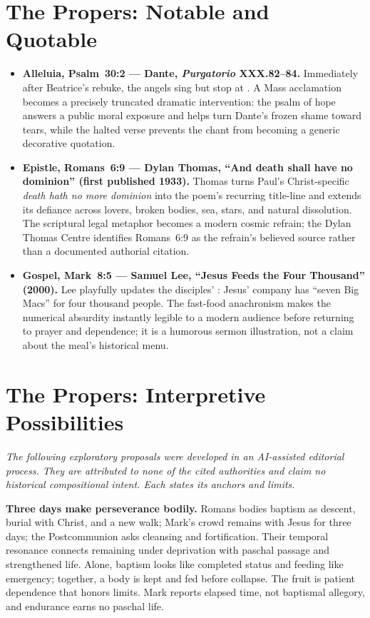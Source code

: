\sectionguard
\section*{The Propers: Notable and Quotable}

{\small
\begin{itemize}[itemsep=0.35em,topsep=0.2em,parsep=0pt]
\item \textbf{Alleluia, Psalm~30:2 --- Dante, \emph{Purgatorio} XXX.82--84.} Immediately after Beatrice's rebuke, the angels sing  but stop at . A Mass acclamation becomes a precisely truncated dramatic intervention: the psalm of hope answers a public moral exposure and helps turn Dante's frozen shame toward tears, while the halted verse prevents the chant from becoming a generic decorative quotation.

\item \textbf{Epistle, Romans~6:9 --- Dylan Thomas, ``And death shall have no dominion'' (first published 1933).} Thomas turns Paul's Christ-specific \emph{death hath no more dominion} into the poem's recurring title-line and extends its defiance across lovers, broken bodies, sea, stars, and natural dissolution. The scriptural legal metaphor becomes a modern cosmic refrain; the Dylan Thomas Centre identifies Romans~6:9 as the refrain's believed source rather than a documented authorial citation.

\item \textbf{Gospel, Mark~8:5 --- Samuel Lee, ``Jesus Feeds the Four Thousand'' (2000).} Lee playfully updates the disciples' : Jesus' company has ``seven Big Macs'' for four thousand people. The fast-food anachronism makes the numerical absurdity instantly legible to a modern audience before returning to prayer and dependence; it is a humorous sermon illustration, not a claim about the meal's historical menu.
\end{itemize}
}

\sectionguard
\section*{The Propers: Interpretive Possibilities}

\noindent\emph{The following exploratory proposals were developed in an AI-assisted editorial process. They are attributed to none of the cited authorities and claim no historical compositional intent. Each states its anchors and limits.}

\noindent\textbf{Three days make perseverance bodily.\enspace{}}
Romans bodies baptism as descent, burial with Christ, and a new walk; Mark's crowd remains with Jesus for three days; the Postcommunion asks cleansing and fortification. Their temporal resonance connects remaining under deprivation with paschal passage and strengthened life. Alone, baptism looks like completed status and feeding like emergency; together, a body is kept and fed before collapse. The fruit is patient dependence that honors limits. Mark reports elapsed time, not baptismal allegory, and endurance earns no paschal life.

